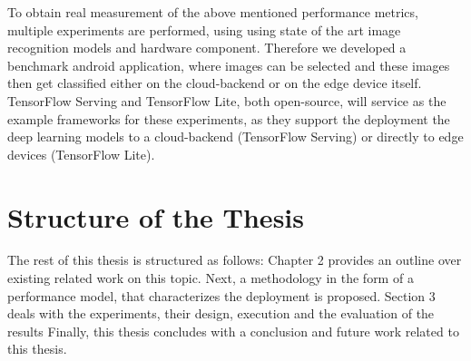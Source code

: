 To obtain real measurement of the above mentioned performance metrics, multiple experiments are performed, using  using state of the art image recognition models and hardware component. Therefore we developed a benchmark android application, where images can be selected and these images then get classified either on the cloud-backend or on the edge device itself.
TensorFlow Serving and TensorFlow Lite, both open-source, will service as the example frameworks for these experiments, as they support the deployment the deep learning models to a cloud-backend (TensorFlow Serving) or directly to edge devices (TensorFlow Lite).


\section{Structure of the Thesis}
The rest of this thesis is structured as follows: Chapter 2 provides an outline over existing related work on this topic. Next, a methodology in the form of a performance model, that characterizes the deployment is proposed.
Section 3 deals with the experiments, their design, execution and the evaluation of the results
Finally, this thesis concludes with a conclusion and future work related to this thesis.
